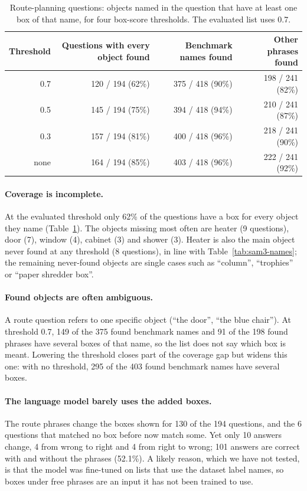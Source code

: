 \begin{table}[t]
\centering
\caption{Route-planning questions: objects named in the question that have at least one box of that name,
for four box-score thresholds. The evaluated list uses 0.7.}
\label{tab:sam3-route}
\begin{tabular}{rrrr}
\toprule
Threshold & Questions with every object found & Benchmark names found & Other phrases found \\
\midrule
0.7  & 120 / 194 (62\%) & 375 / 418 (90\%) & 198 / 241 (82\%) \\
0.5  & 145 / 194 (75\%) & 394 / 418 (94\%) & 210 / 241 (87\%) \\
0.3  & 157 / 194 (81\%) & 400 / 418 (96\%) & 218 / 241 (90\%) \\
none & 164 / 194 (85\%) & 403 / 418 (96\%) & 222 / 241 (92\%) \\
\bottomrule
\end{tabular}
\end{table}

\paragraph{Coverage is incomplete.}
At the evaluated threshold only 62\% of the questions have a box for every object they name
(Table~\ref{tab:sam3-route}). The objects missing most often are heater (9 questions), door (7), window (4),
cabinet (3) and shower (3). Heater is also the main object never found at any threshold (8 questions),
in line with Table~\ref{tab:sam3-names}; the remaining never-found objects are single cases such as
``column'', ``trophies'' or ``paper shredder box''.

\paragraph{Found objects are often ambiguous.}
A route question refers to one specific object (``the door'', ``the blue chair''). At threshold 0.7,
149 of the 375 found benchmark names and 91 of the 198 found phrases have several boxes of that name, so the
list does not say which box is meant. Lowering the threshold closes part of the coverage gap but widens this
one: with no threshold, 295 of the 403 found benchmark names have several boxes.

\paragraph{The language model barely uses the added boxes.}
The route phrases change the boxes shown for 130 of the 194 questions, and the 6 questions that matched no box
before now match some. Yet only 10 answers change, 4 from wrong to right and 4 from right to wrong; 101 answers
are correct with and without the phrases (52.1\%). A likely reason, which we have not
tested, is that the model was fine-tuned on lists that use the dataset label names, so boxes under free phrases
are an input it has not been trained to use.

